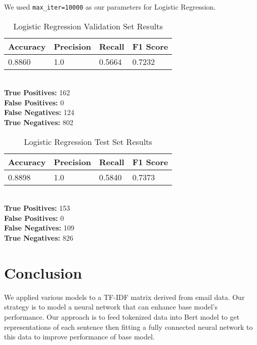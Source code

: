 \documentclass[conference]{IEEEtran}
\begin{document}
We used \verb|max_iter=10000| as our parameters for Logistic Regression.

\begin{table}[H]
    \caption{Logistic Regression Validation Set Results}

    \begin{tabularx}{\linewidth}{|X|X|X|X|}
        \hline
        \textbf{Accuracy} & \textbf{Precision} & \textbf{Recall} & \textbf{F1 Score} \\
        \hline
        0.8860 & 1.0 & 0.5664 & 0.7232 \\
        \hline
    \end{tabularx}\\

    \textbf{True Positives:} 162\\
    \textbf{False Positives:} 0\\
    \textbf{False Negatives:} 124\\
    \textbf{True Negatives:} 802
    \label{tab:lr1}
\end{table}

\begin{table}[H]
    \caption{Logistic Regression Test Set Results}

    \begin{tabularx}{\linewidth}{|X|X|X|X|}
        \hline
        \textbf{Accuracy} & \textbf{Precision} & \textbf{Recall} & \textbf{F1 Score} \\
        \hline
        0.8898 & 1.0 & 0.5840 & 0.7373 \\
        \hline
    \end{tabularx}\\

    \textbf{True Positives:} 153\\
    \textbf{False Positives:} 0\\
    \textbf{False Negatives:} 109\\
    \textbf{True Negatives:} 826
    \label{tab:lr2}
\end{table}

\section{Conclusion}
We applied various models to a TF-IDF matrix derived from email data. Our strategy is to model a neural network that can enhance base model's performance. Our approach is to feed tokenized data into \cite{bert}Bert model to get representations of each sentence then fitting a fully connected neural network to this data to improve performance of base model. 
\end{document}
